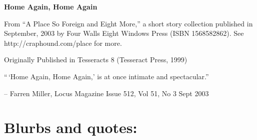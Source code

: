 

\newenvironment{authorof}{\begin{flushright}\sffamily}{\end{flushright}}


\begin{center}
\textbf{\huge\textsf{
Home Again, Home Again
}}
\end{center}


\noindent

From ``A Place So Foreign and Eight More,'' a short story
collection published in September, 2003 by Four Walls Eight Windows
Press (ISBN 1568582862). See http://craphound.com/place for more.

Originally Published in Tesseracts 8 (Tesseract Press, 1999)

``\,`Home Again, Home Again,' is at once intimate and spectacular.''

\begin{authorof}
-- Farren Miller,  Locus Magazine  Issue 512, Vol 51, No 3
  Sept 2003 
\end{authorof}

\section{Blurbs and quotes:}

